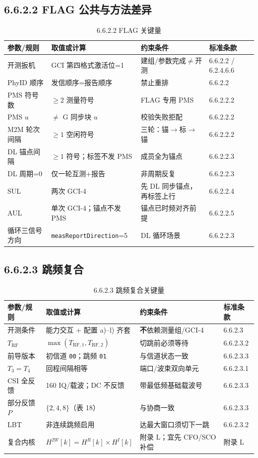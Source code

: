 \documentclass[11pt,a4paper]{ctexart}
\begin{document}
\subsection{6.6.2.2 FLAG 公共与方法差异}

\begin{longtable}{L{3cm}L{4.2cm}L{4.5cm}L{2cm}}
\caption{6.6.2.2 FLAG 关键量\label{tab:6622-flag}} \\
\toprule
\textbf{参数/规则} & \textbf{取值或计算} & \textbf{约束条件} & \textbf{标准条款} \\
\midrule
开测扳机 & GCI 第四格式激活位=1 & 建组/参数完成$\neq$开测 & 6.6.2.2 / 6.2.4.6.6 \\
PhyID 顺序 & 发信顺序=报告顺序 & 禁止重排 & 6.6.2.2 \\
PMS 符号数 & $\ge 2$ 测量符号 & FLAG 专用 PMS & 6.6.2.2.2 \\
PMS $u$ & $\neq$ G 同步块 $u$ & 校验失败拒配 & 6.6.2.2.2 \\
M2M 轮次间隔 & $\ge 1$ 空闲符号 & 三轮：锚$\rightarrow$标$\rightarrow$锚 & 6.6.2.2.2 \\
DL 锚点间隔 & $\ge 1$ 符号；标签不发 PMS & 成员全为锚点 & 6.6.2.2.3 \\
DL 周期=0 & 仅一轮互测+报告 & 非周期反复 & 6.6.2.2.3 \\
SUL & 两次 GCI-4 & 先 DL 同步锚点，再标签上行 & 6.6.2.2.4 \\
AUL & 单次 GCI-4；锚点不发 PMS & 锚点已时频对齐前提 & 6.6.2.2.5 \\
循环三信号方向 & \texttt{measReportDirection}=5 & DL 循环场景 & 6.6.2.2.3 \\
\bottomrule
\end{longtable}

\subsection{6.6.2.3 跳频复合}

\begin{longtable}{L{3cm}L{4.2cm}L{4.5cm}L{2cm}}
\caption{6.6.2.3 跳频复合关键量\label{tab:6623-hop}} \\
\toprule
\textbf{参数/规则} & \textbf{取值或计算} & \textbf{约束条件} & \textbf{标准条款} \\
\midrule
开测条件 & 能力交互 + 配置 a)--l) 齐套 & \textbf{不}依赖测量组/GCI-4 & 6.6.2.3 \\
$T_{\mathrm{RF}}$ & $\max(T_{\mathrm{RF},1},T_{\mathrm{RF},2})$ & 切跳前必须等待 & 6.6.2.3.2 \\
前导版本 & 初信道 \texttt{00}；跳频 \texttt{01} & 与信道状态一致 & 6.6.2.3.3 \\
$T_3{=}T_4$ & 回程间隔相等 & 端口/波束双向单元 & 6.6.2.3.1 \\
CSI 全反馈 & 160 IQ/载波；DC 不反馈 & 带最低频基础载波号 & 6.6.2.3.3 \\
部分反馈 $P$ & $\{2,4,8\}$（表 18） & 与协商一致 & 6.6.2.3.3 \\
LBT & 非连续跳频启用 & 达最大窗口须切下一跳 & 6.6.2.3.2 \\
复合内核 & $H^{2W}[k]{=}H^{R}[k]\times H^{I}[k]$ & 附录 L；宜先 CFO/SCO 补偿 & 附录 L \\
\bottomrule
\end{longtable}
\end{document}
